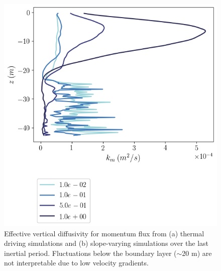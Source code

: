 \documentclass[draft,jgrga]{agutexSI2019}
\begin{document}
\begin{figure}[]
\begin{minipage}{0.5\textwidth}
        \includegraphics[trim={0 4.5cm 0 0},clip, width=\textwidth]{Figures/km_cmp_slope_46h_tav12_z_profile.png}
    \end{minipage}
    \caption{Effective vertical diffusivity for momentum flux from (a) thermal driving simulations and (b) slope-varying simulations over the last inertial period. Fluctuations below the boundary layer ($\sim$20 m) are not interpretable due to low velocity gradients. }
    \label{fig:km}
\end{figure}
\end{document}
